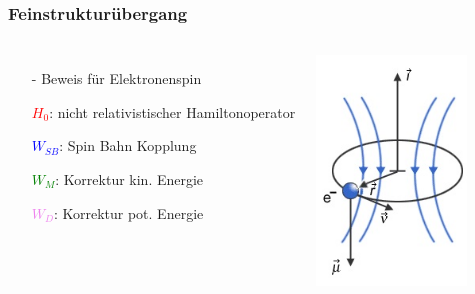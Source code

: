 \begin{frame}
  \frametitle{Feinstrukturübergang}
	\begin{columns}
		\begin{itemize}
		\item[-] Beweis für Elektronenspin 
		\item[]  
		\item[]  \textcolor{red}{$H_0$}: nicht relativistischer Hamiltonoperator
		\item[]  \textcolor{blue}{$W_{SB}$}: Spin Bahn Kopplung
		\item[]  \textcolor{green}{$W_M$}: Korrektur kin. Energie
			\item[]  \textcolor{violet}{$W_D$}: Korrektur pot. Energie
		
		\end{itemize}
		
		
		\includegraphics[width = 4cm]{./pictures/feinstrukturelektron}
			
	\end{columns}
	
	
	
\end{frame}

